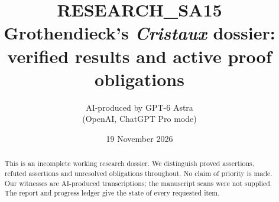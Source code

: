 \documentclass[11pt,a4paper]{article}
\title{RESEARCH\_SA15\\Grothendieck's \emph{Cristaux} dossier:\\verified results and active proof obligations}
\author{AI-produced by GPT-6 Astra\\(OpenAI, ChatGPT Pro mode)}
\date{19 November 2026}
\theoremstyle{definition}
\begin{document}
\maketitle
\begin{abstract}
This is an incomplete working research dossier. We distinguish proved assertions,
refuted assertions and unresolved obligations throughout. No claim of priority is made.
Our witnesses are AI-produced transcriptions; the manuscript scans were not supplied.
The report and progress ledger give the state of every requested item.
\end{abstract}
\tableofcontents



\end{document}
